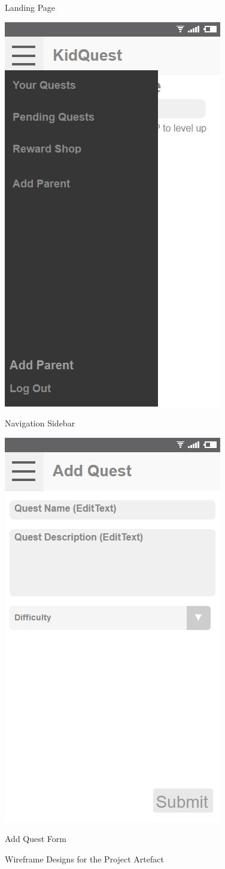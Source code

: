 \begin{figure}[ht]
\begin{minipage}[b]{0.5\linewidth}
    \caption{Landing Page} 
    \vspace{4ex}
  \end{minipage} 
  \begin{minipage}[b]{0.5\linewidth}
    \centering
    \includegraphics[width=.5\linewidth, frame]{../images/Wireframes/NavigationScreen.png}
    \caption{Navigation Sidebar} 
    \vspace{4ex}
  \end{minipage}%
  \begin{minipage}[b]{0.5\linewidth}
    \centering
    \includegraphics[width=.5\linewidth, frame]{../images/Wireframes/AddQuestScreen.png}
    \caption{Add Quest Form} 
    \vspace{4ex}
  \end{minipage} 
  \caption{Wireframe Designs for the Project Artefact}
\end{figure}